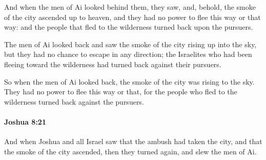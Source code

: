 			\begin{versebox}
					\item[BHS] 
					\item[ASV] And when the men of Ai looked behind them, they saw, and, behold, the smoke of the city ascended up to heaven, and they had no power to flee this way or that way: and the people that fled to the wilderness turned back upon the pursuers.
					\item[NIV] The men of Ai looked back and saw the smoke of the city rising up into the sky, but they had no chance to escape in any direction; the Israelites who had been fleeing toward the wilderness had turned back against their pursuers.
					\item[NRSV] So when the men of Ai looked back, the smoke of the city was rising to the sky. They had no power to flee this way or that, for the people who fled to the wilderness turned back against the pursuers.
			\end{versebox}

		\paragraph{Joshua 8:21} %
			\label{JOSHUA-8-21}

			And when Joshua and all Israel saw that the ambush had taken the city, and that the smoke of the city ascended, then they turned again, and slew the men of Ai.

